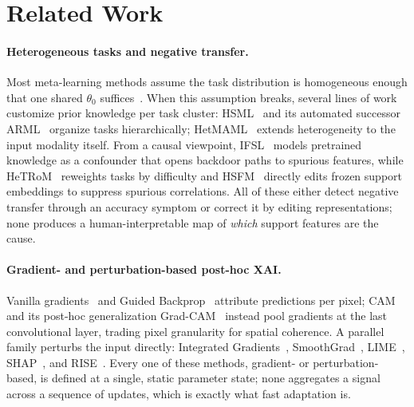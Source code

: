 \section{Related Work}
\label{sec:related}

\paragraph{Heterogeneous tasks and negative transfer.}
Most meta-learning methods assume the task distribution is homogeneous enough that one shared $\theta_0$ suffices~\cite{finn2017model,snell2017prototypical,vinyals2016matching,santoro2016meta}. When this assumption breaks, several lines of work customize prior knowledge per task cluster: HSML~\cite{yao2019hierarchically} and its automated successor ARML~\cite{yao2020automated} organize tasks hierarchically; HetMAML~\cite{chen2021hetmaml} extends heterogeneity to the input modality itself. From a causal viewpoint, IFSL~\cite{yue2020interventional} models pretrained knowledge as a confounder that opens backdoor paths to spurious features, while HeTRoM~\cite{si2025meta} reweights tasks by difficulty and HSFM~\cite{parast2026hsfm} directly edits frozen support embeddings to suppress spurious correlations. All of these either detect negative transfer through an accuracy symptom or correct it by editing representations; none produces a human-interpretable map of \emph{which} support features are the cause.

\paragraph{Gradient- and perturbation-based post-hoc XAI.}
Vanilla gradients~\cite{simonyan2014visualising} and Guided Backprop~\cite{springenberg2014striving} attribute predictions per pixel; CAM~\cite{zhou2016learning} and its post-hoc generalization Grad-CAM~\cite{selvaraju2020grad} instead pool gradients at the last convolutional layer, trading pixel granularity for spatial coherence. A parallel family perturbs the input directly: Integrated Gradients~\cite{sundararajan2017axiomatic}, SmoothGrad~\cite{smilkov2017smoothgrad}, LIME~\cite{ribeiro2016lime}, SHAP~\cite{lundberg2017unified}, and RISE~\cite{petsiuk2018rise}. Every one of these methods, gradient- or perturbation-based, is defined at a single, static parameter state; none aggregates a signal across a sequence of updates, which is exactly what fast adaptation is.

